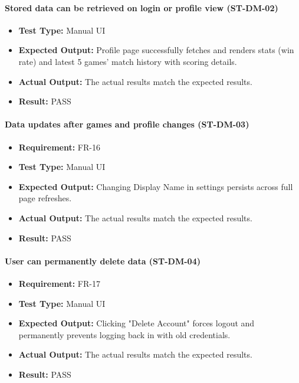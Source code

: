 \documentclass[12pt, titlepage]{article}
\begin{document}
\paragraph{Stored data can be retrieved on login or profile view (ST-DM-02)}
\begin{itemize}
  \item \textbf{Test Type:} Manual UI
  \item \textbf{Expected Output:} Profile page successfully fetches and renders stats (win rate) and latest 5 games' match history with scoring details.
  \item \textbf{Actual Output:} The actual results match the expected results.
  \item \textbf{Result:} PASS
\end{itemize}

\paragraph{Data updates after games and profile changes (ST-DM-03)}
\begin{itemize}
  \item \textbf{Requirement:} FR-16
  \item \textbf{Test Type:} Manual UI
  \item \textbf{Expected Output:} Changing Display Name in settings persists across full page refreshes.
  \item \textbf{Actual Output:} The actual results match the expected results.
  \item \textbf{Result:} PASS
\end{itemize}

\paragraph{User can permanently delete data (ST-DM-04)}
\begin{itemize}
  \item \textbf{Requirement:} FR-17
  \item \textbf{Test Type:} Manual UI
  \item \textbf{Expected Output:} Clicking "Delete Account" forces logout and permanently prevents logging back in with old credentials.
  \item \textbf{Actual Output:} The actual results match the expected results.
  \item \textbf{Result:} PASS
\end{itemize}
\end{document}
